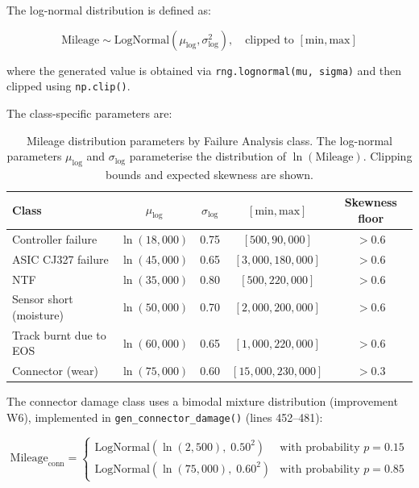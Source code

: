 \documentclass[10pt,a4paper]{article}
\begin{document}
The log-normal distribution is defined as:

\begin{equation}
\text{Mileage} \sim \text{LogNormal}(\mu_{\log}, \sigma_{\log}^2), \quad \text{clipped to } [\text{min}, \text{max}]
\label{eq:mileage-lognormal}
\end{equation}

where the generated value is obtained via \texttt{rng.lognormal(mu, sigma)} and then clipped using \texttt{np.clip()}.

The class-specific parameters are:

\begin{table}[H]
\centering
\caption{Mileage distribution parameters by Failure Analysis class. The log-normal parameters $\mu_{\log}$ and $\sigma_{\log}$ parameterise the distribution of $\ln(\text{Mileage})$. Clipping bounds and expected skewness are shown.}
\label{tab:mileage-params}
\begin{tabular}{lcccc}
\toprule
\textbf{Class} & $\mu_{\log}$ & $\sigma_{\log}$ & $[\text{min}, \text{max}]$ & \textbf{Skewness floor} \\
\midrule
Controller failure     & $\ln(18{,}000)$  & 0.75 & $[500, 90{,}000]$    & $> 0.6$ \\
ASIC CJ327 failure     & $\ln(45{,}000)$  & 0.65 & $[3{,}000, 180{,}000]$ & $> 0.6$ \\
NTF                    & $\ln(35{,}000)$  & 0.80 & $[500, 220{,}000]$   & $> 0.6$ \\
Sensor short (moisture) & $\ln(50{,}000)$ & 0.70 & $[2{,}000, 200{,}000]$ & $> 0.6$ \\
Track burnt due to EOS & $\ln(60{,}000)$  & 0.65 & $[1{,}000, 220{,}000]$ & $> 0.6$ \\
Connector (wear)       & $\ln(75{,}000)$  & 0.60 & $[15{,}000, 230{,}000]$ & $> 0.3$ \\
\bottomrule
\end{tabular}
\end{table}

The connector damage class uses a bimodal mixture distribution (improvement W6), implemented in \texttt{gen\_connector\_damage()} (lines 452--481):

\begin{equation}
\text{Mileage}_{\text{conn}} = \begin{cases}
\text{LogNormal}(\ln(2{,}500),\; 0.50^2) & \text{with probability } p = 0.15 \\
\text{LogNormal}(\ln(75{,}000),\; 0.60^2) & \text{with probability } p = 0.85
\end{cases}
\label{eq:connector-bimodal}
\end{equation}
\end{document}
